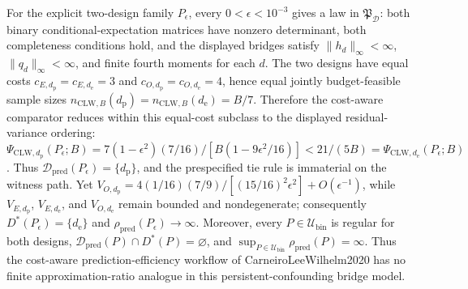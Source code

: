For the explicit two-design family \(P_{\epsilon}\), every \(0<\epsilon<10^{-3}\) gives a law in \(\mathfrak P_{\mathcal D}\): both binary conditional-expectation matrices have nonzero determinant, both completeness conditions hold, and the displayed bridges satisfy \(\|h_d\|_{\infty}<\infty\), \(\|q_d\|_{\infty}<\infty\), and finite fourth moments for each \(d\). The two designs have equal costs \(c_{E,d_{\mathrm p}}=c_{E,d_{\mathrm e}}=3\) and \(c_{O,d_{\mathrm p}}=c_{O,d_{\mathrm e}}=4\), hence equal jointly budget-feasible sample sizes \(n_{\mathrm{CLW},B}(d_{\mathrm p})=n_{\mathrm{CLW},B}(d_{\mathrm e})=B/7\). Therefore the cost-aware comparator reduces within this equal-cost subclass to the displayed residual-variance ordering: \(\Psi_{\mathrm{CLW},d_{\mathrm p}}(P_{\epsilon};B)=7(1-\epsilon^2)(7/16)/[B(1-9\epsilon^2/16)]<21/(5B)=\Psi_{\mathrm{CLW},d_{\mathrm e}}(P_{\epsilon};B)\). Thus \(\mathcal D_{\mathrm{pred}}(P_{\epsilon})=\{d_{\mathrm p}\}\), and the prespecified tie rule is immaterial on the witness path. Yet \(V_{O,d_{\mathrm p}}=4(1/16)(7/9)/[(15/16)^2\epsilon^2]+O(\epsilon^{-1})\), while \(V_{E,d_{\mathrm p}}\), \(V_{E,d_{\mathrm e}}\), and \(V_{O,d_{\mathrm e}}\) remain bounded and nondegenerate; consequently \(D^*(P_{\epsilon})=\{d_{\mathrm e}\}\) and \(\rho_{\mathrm{pred}}(P_{\epsilon})\to\infty\). Moreover, every \(P\in\mathcal U_{\mathrm{bin}}\) is regular for both designs, \(\mathcal D_{\mathrm{pred}}(P)\cap D^*(P)=\varnothing\), and \(\sup_{P\in\mathcal U_{\mathrm{bin}}}\rho_{\mathrm{pred}}(P)=\infty\). Thus the cost-aware prediction-efficiency workflow of CarneiroLeeWilhelm2020 has no finite approximation-ratio analogue in this persistent-confounding bridge model.